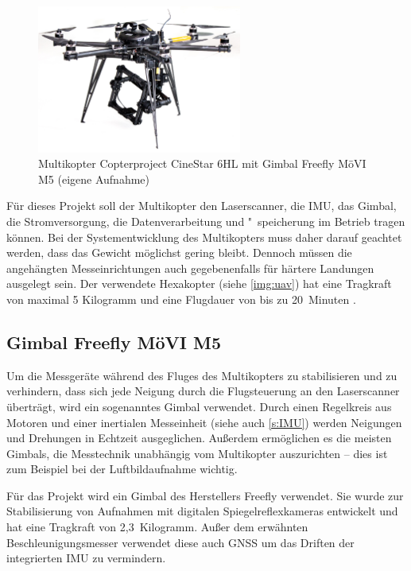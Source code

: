 \documentclass[a4paper,12pt,bibliography=totoc, listof=totoc,titlepage,pointlessnumbers]{scrreprt}
\begin{document}
\begin{figure}[!ht]
 \centering
 \includegraphics[width=0.6\textwidth]{./img/uav.jpg}
 \caption{Multikopter Copterproject CineStar 6HL mit Gimbal Freefly MöVI M5 (eigene Aufnahme)}
 \label{img:uav}
\end{figure}

Für dieses Projekt soll der Multikopter den Laser\-scan\-ner, die IMU, das Gimbal, die Stromversorgung, die Datenverarbeitung und "~speicherung im Betrieb tragen können. Bei der Systementwicklung des Multikopters muss daher darauf geachtet werden, dass das Gewicht möglichst gering bleibt. Dennoch müssen die angehängten Messeinrichtungen auch gegebenenfalls für härtere Landungen ausgelegt sein. Der verwendete Hexakopter (siehe \autoref{img:uav}) hat eine Tragkraft von maximal 5 Kilogramm und eine Flugdauer von bis zu 20~Minuten \citep{Schulz}.

\subsection{Gimbal Freefly MöVI M5}
Um die Messgeräte während des Fluges des Multikopters zu stabilisieren und zu verhindern, dass sich jede Neigung durch die Flug\-steuerung an den Laser\-scan\-ner überträgt, wird ein sogenanntes Gimbal verwendet. Durch einen Regelkreis aus Motoren und einer inertialen Messeinheit (siehe auch \autoref{s:IMU}) werden Neigungen und Drehungen in Echtzeit ausgeglichen. Außerdem ermöglichen es die meisten Gimbals, die Messtechnik unabhängig vom Multikopter auszurichten -- dies ist zum Beispiel bei der Luftbildaufnahme wichtig.

Für das Projekt wird ein Gimbal des Herstellers Freefly verwendet. Sie wurde zur Stabilisierung von Aufnahmen mit digitalen Spiegelreflexkameras entwickelt und hat eine Tragkraft von 2,3~Kilogramm. Außer dem erwähnten Beschleunigungsmesser verwendet diese auch GNSS um das Driften der integrierten IMU zu vermindern. \citep{movim5}
\end{document}
